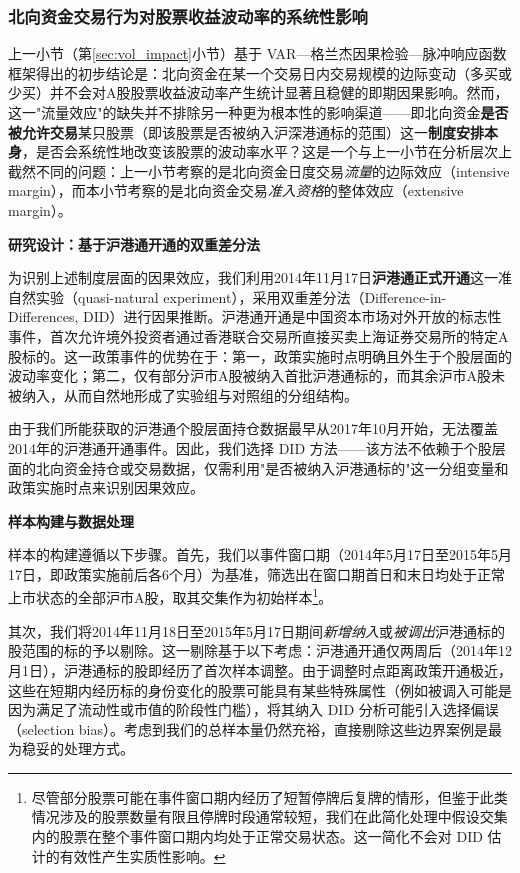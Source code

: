 \documentclass{article}
\begin{document}
\subsubsection{北向资金交易行为对股票收益波动率的系统性影响}
\label{sec:vol_systematic}

上一小节（第\ref{sec:vol_impact}小节）基于 VAR—格兰杰因果检验—脉冲响应函数框架得出的初步结论是：北向资金在某一个交易日内交易规模的边际变动（多买或少买）并不会对A股股票收益波动率产生统计显著且稳健的即期因果影响。然而，这一"流量效应"的缺失并不排除另一种更为根本性的影响渠道——即北向资金\textbf{是否被允许交易}某只股票（即该股票是否被纳入沪深港通标的范围）这一\textbf{制度安排本身}，是否会系统性地改变该股票的波动率水平？这是一个与上一小节在分析层次上截然不同的问题：上一小节考察的是北向资金日度交易\textit{流量}的边际效应（intensive margin），而本小节考察的是北向资金交易\textit{准入资格}的整体效应（extensive margin）。

\vspace{0.5em}
\noindent\textbf{研究设计：基于沪港通开通的双重差分法}

为识别上述制度层面的因果效应，我们利用2014年11月17日\textbf{沪港通正式开通}这一准自然实验（quasi-natural experiment），采用双重差分法（Difference-in-Differences, DID）进行因果推断。沪港通开通是中国资本市场对外开放的标志性事件，首次允许境外投资者通过香港联合交易所直接买卖上海证券交易所的特定A股标的。这一政策事件的优势在于：第一，政策实施时点明确且外生于个股层面的波动率变化；第二，仅有部分沪市A股被纳入首批沪港通标的，而其余沪市A股未被纳入，从而自然地形成了实验组与对照组的分组结构。

由于我们所能获取的沪港通个股层面持仓数据最早从2017年10月开始，无法覆盖2014年的沪港通开通事件。因此，我们选择 DID 方法——该方法不依赖于个股层面的北向资金持仓或交易数据，仅需利用"是否被纳入沪港通标的"这一分组变量和政策实施时点来识别因果效应。

\vspace{0.5em}
\noindent\textbf{样本构建与数据处理}

样本的构建遵循以下步骤。首先，我们以事件窗口期（2014年5月17日至2015年5月17日，即政策实施前后各6个月）为基准，筛选出在窗口期首日和末日均处于正常上市状态的全部沪市A股，取其交集作为初始样本\footnote{尽管部分股票可能在事件窗口期内经历了短暂停牌后复牌的情形，但鉴于此类情况涉及的股票数量有限且停牌时段通常较短，我们在此简化处理中假设交集内的股票在整个事件窗口期内均处于正常交易状态。这一简化不会对 DID 估计的有效性产生实质性影响。}。

其次，我们将2014年11月18日至2015年5月17日期间\textit{新增纳入}或\textit{被调出}沪港通标的股范围的标的予以剔除。这一剔除基于以下考虑：沪港通开通仅两周后（2014年12月1日），沪港通标的股即经历了首次样本调整。由于调整时点距离政策开通极近，这些在短期内经历标的身份变化的股票可能具有某些特殊属性（例如被调入可能是因为满足了流动性或市值的阶段性门槛），将其纳入 DID 分析可能引入选择偏误（selection bias）。考虑到我们的总样本量仍然充裕，直接剔除这些边界案例是最为稳妥的处理方式。
\end{document}
